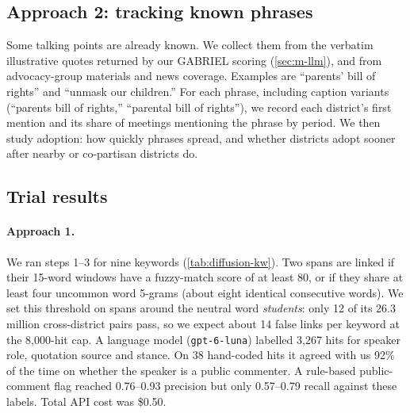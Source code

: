 \subsection{Approach 2: tracking known phrases}

Some talking points are already known. We collect them from the verbatim illustrative quotes
returned by our GABRIEL scoring (\cref{sec:m-llm}), and from advocacy-group
materials and news coverage. Examples are ``parents' bill of rights'' and ``unmask our children.''
For each phrase, including caption variants (``parents bill of rights,'' ``parental bill of
rights''), we record each district's first mention and its share of meetings mentioning the
phrase by period. We then study adoption: how quickly phrases spread, and whether districts adopt
sooner after nearby or co-partisan districts do.

\subsection{Trial results}\label{sec:diffusion-results}

\paragraph{Approach 1.} We ran steps 1--3 for nine keywords (\cref{tab:diffusion-kw}). Two spans
are linked if their 15-word windows have a fuzzy-match score of at least 80, or if they share at
least four uncommon word 5-grams (about eight identical consecutive words). We set this threshold
on spans around the neutral word \emph{students}: only 12 of its 26.3 million cross-district pairs
pass, so we expect about 14 false links per keyword at the 8,000-hit cap. A language model
(\texttt{gpt-6-luna}) labelled 3,267 hits for speaker role, quotation source and stance. On 38
hand-coded hits it agreed with us 92\% of the time on whether the speaker is a public commenter.
A rule-based public-comment flag reached 0.76--0.93 precision but only 0.57--0.79 recall against
these labels. Total API cost was \$0.50.

